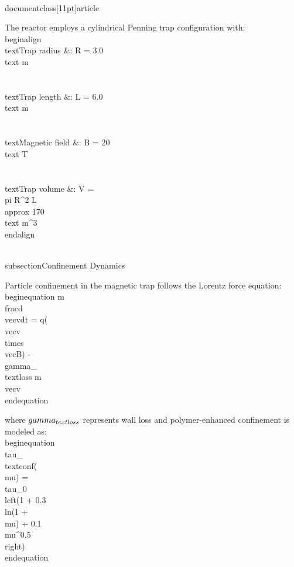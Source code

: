 \\documentclass[11pt]{article}
\begin{document}
The reactor employs a cylindrical Penning trap configuration with:
\\begin{align}
\\text{Trap radius} &: R = 3.0 \\text{ m} \\\\
\\text{Trap length} &: L = 6.0 \\text{ m} \\\\
\\text{Magnetic field} &: B = 20 \\text{ T} \\\\
\\text{Trap volume} &: V = \\pi R^2 L \\approx 170 \\text{ m}^3
\\end{align}

\\subsection{Confinement Dynamics}

Particle confinement in the magnetic trap follows the Lorentz force equation:
\\begin{equation}
m\\frac{d\\vec{v}}{dt} = q(\\vec{v} \\times \\vec{B}) - \\gamma_{\\text{loss}} m\\vec{v}
\\end{equation}

where $\\gamma_{\\text{loss}}$ represents wall loss and polymer-enhanced confinement is modeled as:
\\begin{equation}
\\tau_{\\text{conf}}(\\mu) = \\tau_0 \\left(1 + 0.3 \\ln(1 + \\mu) + 0.1 \\mu^{0.5}\\right)
\\end{equation}
\end{document}
